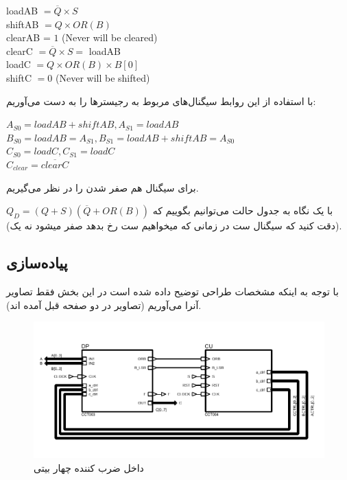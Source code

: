 \documentclass{article}
\begin{document}
\begin{latin}
\noindent
loadAB $= \overline{Q} \times S$\\
shiftAB $= Q  \times OR(B)$\\
clearAB = $1$ (Never will be cleared)\\
clearC $= \overline{Q} \times S = $ loadAB\\
loadC $= Q  \times OR(B) \times B[0]$\\
shiftC $= 0$ (Never will be shifted)
\end{latin}

با استفاده از این روابط سیگنال‌های مربوط به رجیسترها را به دست می‌آوریم:
\begin{latin}
\noindent
$A_{S0} = loadAB + shiftAB ,A_{S1} = loadAB$\\
$B_{S0} = loadAB = A_{S1} ,B_{S1} = loadAB + shiftAB = A_{S0}$\\
$C_{S0} = loadC ,C_{S1} = loadC$\\
$C_{clear} = \overline{clearC}$
\end{latin}

برای سیگنال  هم صفر شدن  را در نظر می‌گیریم.

با یک نگاه به جدول حالت می‌توانیم بگوییم که
$Q_D = (Q+S)(\overline{Q}+OR(B))$
(دقت کنید که سیگنال ست در زمانی که میخواهیم ست رخ بدهد صفر میشود نه یک).

\subsection{پیاده‌سازی}

با توجه به اینکه مشخصات طراحی توضیح داده شده است در این بخش فقط تصاویر آنرا می‌آوریم (تصاویر در دو صفحه قبل آمده اند).

\begin{figure}
	\centering
	\includegraphics[scale=0.5]{./graphics/4bitmult}
	\caption{داخل ضرب کننده چهار بیتی}
\end{figure}
\end{document}
